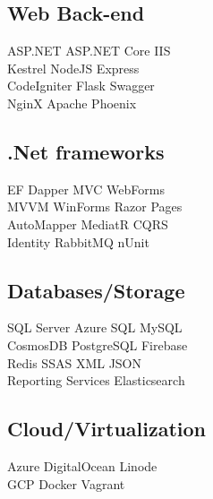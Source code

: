 \documentclass[letterpaper]{deedy-resume} %
\begin{document}
\begin{minipage}[t]{0.33\textwidth}
\sectionspace %

\subsection{Web Back-end}

ASP.NET \textbullet{} ASP.NET Core \textbullet{} IIS\\
Kestrel \textbullet{} NodeJS \textbullet{} Express\\
CodeIgniter \textbullet{} Flask \textbullet{} Swagger\\
NginX \textbullet{} Apache \textbullet{} Phoenix

\sectionspace %

\subsection{.Net frameworks}

EF \textbullet{} Dapper \textbullet{} MVC \textbullet{} WebForms\\
MVVM \textbullet{} WinForms \textbullet{} Razor Pages\\
AutoMapper \textbullet{} MediatR \textbullet{} CQRS\\
Identity \textbullet{} RabbitMQ \textbullet{} nUnit

\sectionspace %

\subsection{Databases/Storage}

SQL Server \textbullet{} Azure SQL \textbullet{} MySQL\\ 
CosmosDB \textbullet{} PostgreSQL \textbullet{} Firebase\\
Redis \textbullet{} SSAS \textbullet{} XML \textbullet{} JSON\\
Reporting Services \textbullet{} Elasticsearch

\sectionspace %

\subsection{Cloud/Virtualization}

Azure \textbullet{} DigitalOcean \textbullet{} Linode\\ 
GCP \textbullet{} Docker \textbullet{} Vagrant


\end{minipage}
\end{document}

